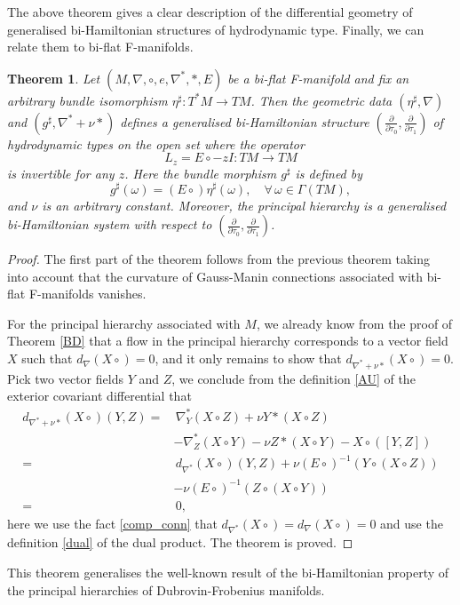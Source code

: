 \documentclass[11pt,a4paper]{amsart}
\numberwithin{equation}{section}
\newtheorem{theorem}{Theorem}[section]
\newcommand{\diff}[2]{\frac{\partial #1}{\partial #2}}
\newcommand{\qt}{\tau}
\newcommand{\qo}{\omega}
\newcommand{\Qg}{\Gamma}
\newcommand{\kk}[1]{\left(#1\right)}
\numberwithin{equation}{section}
\begin{document}
The above theorem gives a clear description of the differential geometry of generalised bi-Hamiltonian structures of hydrodynamic type. Finally, we can relate them to bi-flat F-manifolds.
\begin{theorem}
  Let $(M,\nabla,\circ,e,\nabla^*,*,E)$ be a bi-flat F-manifold and fix an arbitrary bundle isomorphism $\eta^\sharp\colon T^*M\to TM$. Then the geometric data $(\eta^\sharp,\nabla)$ and $(g^\sharp,\nabla^*+\nu *)$ defines a generalised bi-Hamiltonian structure $(\diff{}{\qt_0},\diff{}{\qt_1})$  of hydrodynamic types on the open set where the operator 
  \[
  L_z = E\circ-z I\colon TM\to TM 
  \]
  is invertible for any $z$. Here the bundle morphism $g^\sharp$ is defined by 
  \[
  g^\sharp(\qo) = \kk{E\circ} \eta^\sharp(\qo),\quad\forall\,\qo\in\Qg(TM),
  \]
  and $\nu$ is an arbitrary constant. Moreover, the principal hierarchy is a generalised bi-Hamiltonian system with respect to $(\diff{}{\qt_0},\diff{}{\qt_1})$.
\end{theorem}
\begin{proof}
The first part of the theorem follows from the previous theorem taking into account that
 the curvature of Gauss-Manin connections associated with bi-flat F-manifolds vanishes.

For the principal hierarchy associated with $M$, we already know from the proof of Theorem \ref{BD} that a flow in the principal hierarchy corresponds to a vector field $X$ such that $d_\nabla(X\circ) = 0$, and it only remains to show that $d_{\nabla^*+\nu *}(X\circ) = 0$. Pick two vector fields $Y$ and $Z$, we conclude from the definition \eqref{AU} of the exterior covariant differential that  
\begin{align*}
  d_{\nabla^*+\nu *}(X\circ)(Y,Z) =&\, \nabla^*_Y(X\circ Z)+\nu Y*(X\circ Z)\\
  &-\nabla^*_Z(X\circ Y)-\nu Z*(X\circ Y)-X\circ([Y,Z])\\
  =&\, d_{\nabla^*}(X\circ)(Y,Z)+\nu (E\circ)^{-1}\kk{Y\circ(X\circ Z)}\\
  &-\nu (E\circ)^{-1}\kk{Z\circ(X\circ Y)}\\
  =&\,0,
\end{align*}
here we use the fact \eqref{comp_conn} that $d_{\nabla^*}(X\circ) =d_{\nabla}(X\circ) = 0 $ and use the definition \eqref{dual} of the dual product. The theorem is proved.
\end{proof}

This theorem generalises the well-known result of the bi-Hamiltonian property of the principal hierarchies of Dubrovin-Frobenius manifolds.
\end{document}
